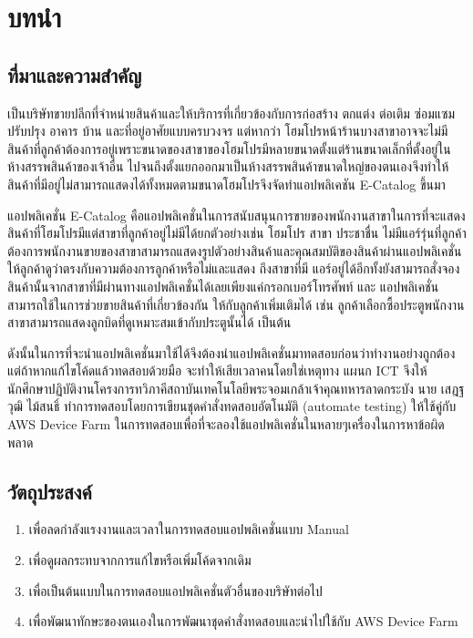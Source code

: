 \chapter{บทนำ}
\thispagestyle{empty}
\label{chapter:introduction}

\section{ที่มาและความสำคัญ}
    {\Company} เป็นบริษัทขายปลีกที่จำหน่ายสินค้าและให้บริการที่เกี่ยวข้องกับการก่อสร้าง ตกแต่ง ต่อเติม ซ่อมแซม ปรับปรุง อาคาร บ้าน และที่อยู่อาศัยแบบครบวงจร
    แต่หากว่า โฮมโปรหน้าร้านบางสาขาอาจจะไม่มีสินค้าที่ลูกค้าต้องการอยู่เพราะขนาดของสาขาของโฮมโปรมีหลายขนาดตั้งแต่ร้านขนาดเล็กที่ตั้งอยู่ในห้างสรรพสินค้าของเจ้าอื่น
    ไปจนถึงตั้งแยกออกมาเป็นห้างสรรพสินค้าขนาดใหญ่ของตนเองจึงทำให้สินค้าที่มีอยู่ไม่สามารถแสดงได้ทั้งหมดตามขนาดโฮมโปรจึงจัดทำแอปพลิเคชัน E-Catalog ขึ้นมา
    \par แอปพลิเคชั่น E-Catalog คือแอปพลิเคชั่นในการสนับสนุนการขายของพนักงานสาขาในการที่จะแสดงสินค้าที่โฮมโปรมีแต่สาขาที่ลูกค้าอยู่ไม่มีได้ยกตัวอย่างเช่น โฮมโปร
    สาขา ประชาชื่น ไม่มีแอร์รุ่นที่ลูกค้าต้องการพนักงานขายของสาขาสามารถแสดงรูปตัวอย่างสินค้าและคุณสมบัติของสินค้าผ่านแอปพลิเคชั่นให้ลูกค้าดูว่าตรงกับความต้องการลูกค้าหรือไม่และแสดง
    ถึงสาขาที่มี แอร์อยู่ได้อีกทั้งยังสามารถสั่งจองสินค้านั้นจากสาขาที่มีผ่านทางแอปพลิเคชั่นได้เลยเพียงแค่กรอกเบอร์โทรศัพท์ และ แอปพลิเคชั่นสามารถใช้ในการช่วยขายสินค้าที่เกี่ยวข้องกัน
    ให้กับลูกค้าเพิ่มเติมได้ เช่น ลูกค้าเลือกซื้อประตูพนักงานสาขาสามารถแสดงลูกบิดที่ดูเหมาะสมเข้ากับประตูนั้นได้ เป็นต้น
    \par ดังนั้นในการที่จะนำแอปพลิเคชั่นมาใช้ได้จึงต้องนำแอปพลิเคชั่นมาทดสอบก่อนว่าทำงานอย่างถูกต้องแต่ถ้าหากแก้ไขโค้ดแล้วทดสอบด้วยมือ
    จะทำให้เสียเวลาคนโดยใช่เหตุทาง แผนก ICT จึงให้นักศึกษาปฏิบัติงานโครงการทวิภาคีสถาบันเทคโนโลยีพระจอมเกล้าเจ้าคุณทหารลาดกระบัง นาย เสฎฐวุฒิ ไม้สนธิ์ ทำการทดสอบโดยการเขียนชุดคำสั่งทดสอบอัตโนมัติ (automate testing) ให้ใช้คู่กับ AWS Device Farm ในการทดสอบเพื่อที่จะลองใช้แอปพลิเคชั่นในหลายๆเครื่องในการหาข้อผิดพลาด

\section{วัตถุประสงค์}
    \begin{enumerate}
        \item เพื่อลดกำลังแรงงานและเวลาในการทดสอบแอปพลิเคชั่นแบบ Manual
        \item เพื่อดูผลกระทบจากการแก้ไขหรือเพิ่มโค้ดจากเดิม
        \item เพื่อเป็นต้นแบบในการทดสอบแอปพลิเคชั่นตัวอื่นของบริษัทต่อไป
        \item เพื่อพัฒนาทักษะของตนเองในการพัฒนาชุดคำสั่งทดสอบและนำไปใช้กับ AWS Device Farm
    \end{enumerate}

